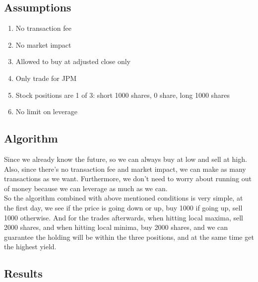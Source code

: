 \documentclass[a4paper]{article}
\begin{document}
\subsection{Assumptions}
	\begin{enumerate}
		\item No transaction fee
		\item No market impact
		\item Allowed to buy at adjusted close only
		\item Only trade for JPM
		\item Stock positions are 1 of 3: short 1000 shares, 0 share, long 1000 shares
		\item No limit on leverage
	\end{enumerate}
\subsection{Algorithm}
	Since we already know the future, so we can always buy at low and sell at high. Also, since there's no
	transaction fee and market impact, we can make as many transactions as we want. Furthermore, we don't need to
	worry about running out of money because we can leverage as much as we can. \\
	So the algorithm combined with above mentioned conditions is very simple, at the first day, we see if the price is
	going down or up, buy 1000 if going up, sell 1000 otherwise. And for the trades afterwards, when hitting local maxima,
	sell 2000 shares, and when hitting local minima, buy 2000 shares, and we can guarantee the holding will be within the
	three positions, and at the same time get the highest yield.
\subsection{Results}
\end{document}
